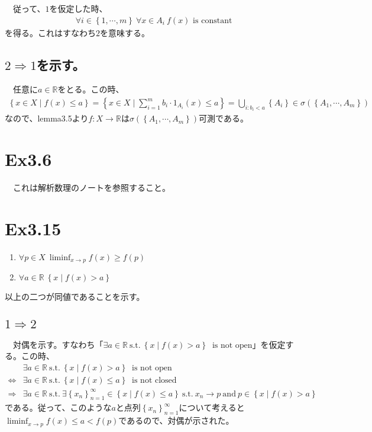 \documentclass{article}
\begin{document}
　従って、$1$を仮定した時、
\begin{align*}
\forall i\in \left\{ 1, \cdots, m\right\}\ \forall x \in A_i\ f(x) \text{\ is constant}
\end{align*}
を得る。これはすなわち$2$を意味する。

\subsection{$2\Rightarrow 1$を示す。}
　任意に$a\in \mathbb{R}$をとる。この時、
\begin{align*}
	\left\{ x\in X \mid f(x)\leq a \right\}  = \left\{ x\in X \mid \sum_{i=1}^{m} b_i \cdot 1_{A_i}(x) \leq a \right\} = \bigcup_{i:b_i < a} \left\{ A_i \right\} \in \sigma\left( \left\{ A_1, \cdots, A_m\right\} \right)
\end{align*}
なので、lemma3.5より$f:X\to\mathbb{R}$は$\sigma\left( \left\{ A_1, \cdots, A_m\right\} \right)$可測である。

\section{Ex3.6}
　これは解析数理のノートを参照すること。

\section{Ex3.15}
\begin{enumerate}
	\item $\forall p \in X\ \liminf_{x\to p} f(x) \geq f(p)$ 
	\item $\forall a\in \mathbb{R}\ \left\{ x\mid f(x) >a\right\}$
\end{enumerate}
以上の二つが同値であることを示す。

\subsection{$1\Rightarrow 2$}
　対偶を示す。すなわち「$\exists a\in \mathbb{R}\ \text{s.t.}\ \left\{ x\mid f(x) > a \right\}\ \text{\ is not open}$」を仮定する。この時、
\begin{align*}
&\exists a\in \mathbb{R}\ \text{s.t.}\ \left\{ x\mid f(x) > a \right\}\ \text{\ is not open}\\
\Leftrightarrow
&\exists a\in \mathbb{R}\ \text{s.t.}\ \left\{ x\mid f(x) \leq a \right\}\ \text{\ is not closed}\\
\Rightarrow
&\exists a\in \mathbb{R}\ \text{s.t.}\  \exists \left\{ x_n \right\}_{n=1}^{\infty} \in \left\{x\mid f(x) \leq a \right\}\ \text{s.t.}\ x_n \to p\ \text{and}\ p\in \left\{x\mid f(x) > a \right\}
\end{align*}
である。従って、このような$a$と点列$\left\{ x_n \right\}_{n=1}^{\infty}$について考えると$\liminf_{x\to p} f(x) \leq a < f(p)$であるので、対偶が示された。
\end{document}
